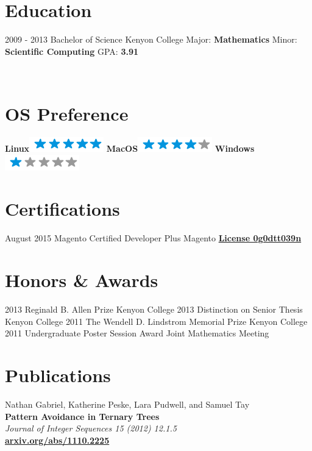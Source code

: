 \documentclass[]{friggeri-cv}
\begin{document}
\section{Education}
\begin{entrylist}
  \entry
    {2009 - 2013}
    {Bachelor of Science}
    {Kenyon College}
    {Major: \textbf{Mathematics} Minor: \textbf{Scientific Computing} GPA: \textbf{3.91}}
\end{entrylist}

\newpage %

\begin{aside}
~
~
~
\section{OS Preference}
  \textbf{Linux}\includegraphics[scale=0.40]{img/5stars.png}
  \textbf{MacOS}\includegraphics[scale=0.40]{img/4stars.png}
  \textbf{Windows}\includegraphics[scale=0.40]{img/1stars.png}
  ~
  ~
\end{aside}

\section{Certifications}
\begin{entrylist}
  \entry
    {August 2015}
    {Magento Certified Developer Plus}
    {Magento}
    {\href{http://www.magentocommerce.com/certification/directory/dev/1956978/}{\textbf{License 0g0dtt039n}}}
\end{entrylist}

\section{Honors \& Awards}
\begin{entrylist}
  \entry
    {2013}
    {Reginald B. Allen Prize}
    {Kenyon College}
    {}
  \entry
    {2013}
    {Distinction on Senior Thesis}
    {Kenyon College}
    {}
  \entry
    {2011}
    {The Wendell D. Lindstrom Memorial Prize}
    {Kenyon College}
    {}
  \entry
    {2011}
    {Undergraduate Poster Session Award}
    {Joint Mathematics Meeting}
    {}
\end{entrylist}

\section{Publications}
Nathan Gabriel, Katherine Peske, Lara Pudwell, and Samuel Tay\\
\textbf{Pattern Avoidance in Ternary Trees}\\
\emph{Journal of Integer Sequences 15 (2012) 12.1.5}\\
\href{http://arxiv.org/abs/1110.2225}{\textbf{arxiv.org/abs/1110.2225}}
\end{document}
